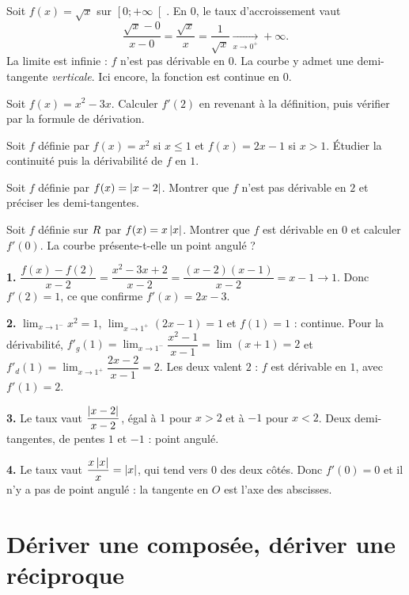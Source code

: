 \begin{exemple}
Soit $f(x) = \sqrt{x}$ sur $\left[0 ; +\infty\right[$. En $0$, le taux
d'accroissement vaut
\[
  \frac{\sqrt{x}-0}{x-0} = \frac{\sqrt{x}}{x} = \frac{1}{\sqrt{x}}
  \xrightarrow[x \to 0^{+}]{} +\infty .
\]
La limite est infinie : $f$ n'est pas dérivable en $0$. La courbe y admet une
demi-tangente \emph{verticale}. Ici encore, la fonction est continue en $0$.
\end{exemple}

\begin{entrainement}
\exo[\niveau{1}] Soit $f(x) = x^{2}-3x$. Calculer $f'(2)$ en revenant à la
définition, puis vérifier par la formule de dérivation.

\exo[\niveau{2}] Soit $f$ définie par $f(x) = x^{2}$ si $x \leq 1$ et
$f(x) = 2x-1$ si $x > 1$. Étudier la continuité puis la dérivabilité de $f$
en $1$.

\exo[\niveau{2}] Soit $f$ définie par $f(x) = \left|x-2\right|$. Montrer que $f$
n'est pas dérivable en $2$ et préciser les demi-tangentes.

\exo[\niveau{3}] Soit $f$ définie sur $R$ par $f(x) = x\left|x\right|$. Montrer que
$f$ est dérivable en $0$ et calculer $f'(0)$. La courbe présente-t-elle un
point angulé ?
\end{entrainement}

\begin{corrige}
\textbf{1.} $\dfrac{f(x)-f(2)}{x-2} = \dfrac{x^{2}-3x+2}{x-2} = \dfrac{(x-2)(x-1)}{x-2} = x-1 \to 1$.
Donc $f'(2) = 1$, ce que confirme $f'(x) = 2x-3$.

\textbf{2.} $\lim_{x \to 1^{-}} x^{2} = 1$, $\lim_{x \to 1^{+}} (2x-1) = 1$ et
$f(1) = 1$ : continue. Pour la dérivabilité,
$f'_{g}(1) = \lim_{x \to 1^{-}} \dfrac{x^{2}-1}{x-1} = \lim (x+1) = 2$ et
$f'_{d}(1) = \lim_{x \to 1^{+}} \dfrac{2x-2}{x-1} = 2$. Les deux valent $2$ :
$f$ est dérivable en $1$, avec $f'(1) = 2$.

\textbf{3.} Le taux vaut $\dfrac{\left|x-2\right|}{x-2}$, égal à $1$ pour $x>2$ et à
$-1$ pour $x<2$. Deux demi-tangentes, de pentes $1$ et $-1$ : point angulé.

\textbf{4.} Le taux vaut $\dfrac{x\left|x\right|}{x} = \left|x\right|$, qui tend vers $0$ des
deux côtés. Donc $f'(0) = 0$ et il n'y a pas de point angulé : la tangente en
$O$ est l'axe des abscisses.
\end{corrige}

\section{Dériver une composée, dériver une réciproque}

